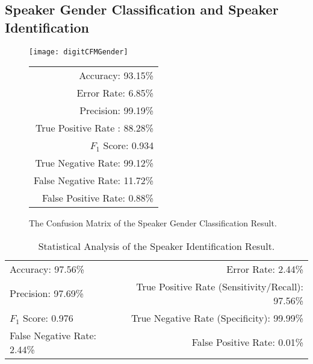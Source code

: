 \subsection{Speaker Gender Classification and Speaker Identification}


\begin{figure}[!h]
	\begin{minipage}{\linewidth}
			\centering
		\begin{minipage}[c]{0.35\linewidth}
			
			\texttt{[image: digitCFMGender]}
		\end{minipage}
		\begin{minipage}[b]{0.49\linewidth}
			 \centering
				\begin{tabular}{r}
				\toprule
				Accuracy: 93.15\% \\ Error Rate: 6.85\% \\
				Precision: 99.19\% \\True Positive Rate : 88.28\% \\
				$F_1$ Score: 0.934 \\ True Negative Rate: 99.12\% \\
				False Negative Rate: 11.72\% \\ False Positive Rate: 0.88\% \\
				\bottomrule
			\end{tabular}
		\end{minipage}
	\end{minipage}
\caption{The Confusion Matrix of the Speaker Gender Classification Result. 
		}
	\label{fig:genderCFM}
\end{figure}

\begin{table}[!h]
	\caption{Statistical Analysis of the Speaker Identification Result.}
	\label{tab:idTable}
	\centering	
	\centering
		\begin{tabular}{lr}
		\toprule
		Accuracy: 97.56\% & \hspace{-.2in} Error Rate: 2.44\% \\
		Precision: 97.69\% & \hspace{-.2in} True Positive Rate (Sensitivity/Recall): 97.56\% \\
		$F_1$ Score: 0.976 & \hspace{-.2in} True Negative Rate (Specificity): 99.99\% \\
		False Negative Rate: 2.44\% & \hspace{-.2in} False Positive Rate: 0.01\% \\
		\bottomrule
	\end{tabular}
\end{table}

